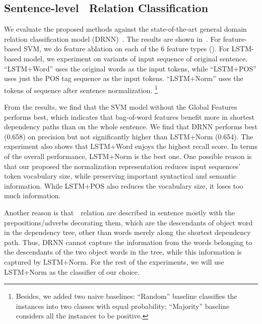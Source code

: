 \subsection{Sentence-level \lnear\ Relation Classification}
We evaluate the proposed methods against the state-of-the-art general domain relation 
classification model (DRNN)~\cite{Xu2016ImprovedRC}. 
The results are shown in~.
For feature-based SVM, we do feature ablation on each of the 6 feature types (). For LSTM-based model, we experiment on variants of input sequence of original sentence.
``LSTM+Word'' uses the original words as the input tokens, while ``LSTM+POS'' uses just the POS tag sequence as the input tokens. ``LSTM+Norm'' uses the tokens of sequence after sentence normalization. \footnote{Besides, we added two naive baselines: ``Random'' baseline
	classifies the instances into two classes with equal probability; 
	``Majority'' baseline considers all the instances to be positive.}

From the results, we find that the SVM model without the Global Features performs best, which indicates that bag-of-word features benefit more in shortest dependency paths than on the whole sentence.
We find that DRNN performs best (0.658) on precision but not significantly higher than LSTM+Norm (0.654). 
The experiment also shows that LSTM+Word enjoys the highest recall score.
In terms of the overall performance, LSTM+Norm is the best one. 
One possible reason is that our proposed the normalization representation reduces input sequences' token vocabulary size, while preserving important syntactical and semantic information. While LSTM+POS also reduces the vocabulary size, it loses too much information. 

Another reason is that~\lnear\ relation are described in sentence mostly with the prepositions/adverbs decorating them, which are the descendants of object word in the dependency tree, other than words merely along the shortest dependency path. 
Thus, DRNN cannot capture the information from the words belonging to the descendants of the two object words in the tree, while this information is captured by LSTM+Norm. For the rest of the experiments, we will use LSTM+Norm as the classifier of our choice.



